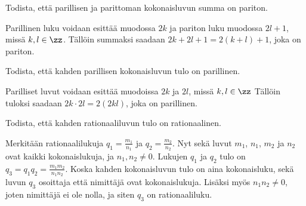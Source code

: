 \begin{tehtavasivu}

	\begin{tehtava}
		\begin{vastaus}
		\end{vastaus}
	\end{tehtava}

	\begin{tehtava}
		Todista, että parillisen ja parittoman kokonaisluvun summa on pariton.
		\begin{vastaus}
			Parillinen luku voidaan esittää muodossa $2k$ ja pariton luku muodossa $2l+1$, missä $k, l \in \zz$.
			Tällöin summaksi saadaan $2k+2l+1 = 2(k+l)+1$, joka on pariton.
		\end{vastaus}
	\end{tehtava}

	\begin{tehtava}
		Todista, että kahden parillisen kokonaisluvun tulo on parillinen.
		\begin{vastaus}
			Parilliset luvut voidaan esittää muodoissa $2k$ ja $2l$, missä $k, l \in \zz$
			Tällöin tuloksi saadaan $2k \cdot 2l = 2(2kl)$, joka on parillinen.
		\end{vastaus}
	\end{tehtava}

	\begin{tehtava}
		Todista, että kahden rationaaliluvun tulo on rationaalinen.
		\begin{vastaus}
		Merkitään rationaalilukuja $q_1 = \frac{m_1}{n_1}$ ja $q_2 = \frac{m_2}{n_2}$. Nyt sekä luvut $m_1$, $n_1$, $m_2$ ja $n_2$ ovat kaikki kokonaislukuja, ja $n_1,n_2 \neq 0$. Lukujen $q_1$ ja $q_2$ tulo on $q_3 = q_1q_2 =  \frac{m_1m_2}{n_1n_2}$. Koska kahden kokonaisluvun tulo on aina kokonaisluku, sekä luvun $q_3$ osoittaja että nimittäjä ovat kokonaislukuja. Lisäksi myös $n_1n_2 \neq 0$, joten nimittäjä ei ole nolla, ja siten $q_3$ on rationaaliluku.
		
		\end{vastaus}
	\end{tehtava}


\end{tehtavasivu}

